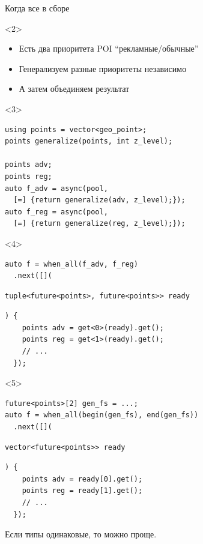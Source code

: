\documentclass[aspectratio=169,pdf,hyperref={unicode},17pt]{beamer}
\begin{document}
\begin{frame}[fragile,t]{Когда все в сборе}
\begin{onlyenv}<2>
\begin{itemize}
 \item Есть два приоритета POI ``рекламные/обычные''
 \item Генерализуем разные приоритеты независимо
 \item А затем объединяем результат
\end{itemize}
\end{onlyenv}
\begin{onlyenv}<3>
\begin{lstlisting}[style=cppcode]
using points = vector<geo_point>;
points generalize(points, int z_level);

points adv;
points reg;
auto f_adv = async(pool,
  [=] {return generalize(adv, z_level);});
auto f_reg = async(pool,
  [=] {return generalize(reg, z_level);});
\end{lstlisting}
\end{onlyenv}
\begin{onlyenv}<4>
\begin{lstlisting}[style=cppcode,aboveskip=0pt,belowskip=0pt]
auto f = when_all(f_adv, f_reg)
  .next([](
\end{lstlisting}
\begin{lstlisting}[style=cppcode,backgroundcolor=\color{gray!30},aboveskip=0pt,belowskip=0pt]
    tuple<future<points>, future<points>> ready
\end{lstlisting}
\begin{lstlisting}[style=cppcode,aboveskip=0pt,belowskip=0pt]
  ) {
    points adv = get<0>(ready).get();
    points reg = get<1>(ready).get();
    // ...
  });
\end{lstlisting}
\end{onlyenv}
\begin{onlyenv}<5>
\begin{lstlisting}[style=cppcode,aboveskip=0pt,belowskip=0pt]
future<points>[2] gen_fs = ...;
auto f = when_all(begin(gen_fs), end(gen_fs))
  .next([](
\end{lstlisting}
\begin{lstlisting}[style=cppcode,backgroundcolor=\color{gray!30},aboveskip=0pt,belowskip=0pt]
    vector<future<points>> ready
\end{lstlisting}
\begin{lstlisting}[style=cppcode,aboveskip=0pt,belowskip=0pt]
  ) {
    points adv = ready[0].get();
    points reg = ready[1].get();
    // ...
  });
\end{lstlisting}
Если типы одинаковые, то можно проще.
\end{onlyenv}
\end{frame}
\end{document}
